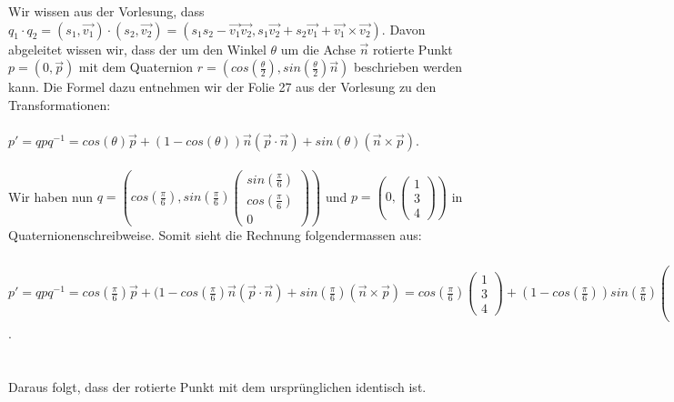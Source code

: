 \documentclass{article} %
\begin{document}
Wir wissen aus der Vorlesung, dass $q_1 \cdot q_2 = (s_1, \vec{v_1}) \cdot (s_2, \vec{v_2}) = (s_1 s_2 - \vec{v_1} \vec{v_2}, s_1 \vec{v_2} + s_2 \vec{v_1} + \vec{v_1} \times \vec{v_2})$. Davon abgeleitet wissen wir, dass der um den Winkel $\theta$ um die Achse $\vec{n}$ rotierte Punkt $p = (0, \vec{p})$ mit dem Quaternion $r = (cos(\frac{\theta}{2}), sin(\frac{\theta}{2})\vec{n})$ beschrieben werden kann. Die Formel dazu entnehmen wir der Folie 27 aus der Vorlesung zu den Transformationen: \\\\$p' = qpq^{-1} = cos(\theta)\vec{p} + (1 - cos(\theta))\vec{n}(\vec{p} \cdot \vec{n}) + sin(\theta) (\vec{n} \times \vec{p})$. \\\\
Wir haben nun $q = (cos(\frac{\pi}{6}), sin(\frac{\pi}{6})\begin{pmatrix}
sin(\frac{\pi}{6})\\
cos(\frac{\pi}{6})\\
0
\end{pmatrix})$ und $p = (0, \begin{pmatrix}
1\\
3\\
4
\end{pmatrix})$ in Quaternionenschreibweise. Somit sieht die Rechnung folgendermassen aus: \\\\
$p' = qpq^{-1} = cos(\frac{\pi}{6})\vec{p} + (1 - cos(\frac{\pi}{6})\vec{n}(\vec{p} \cdot \vec{n}) + sin(\frac{\pi}{6}) (\vec{n} \times \vec{p}) = cos(\frac{\pi}{6}) \begin{pmatrix}
1\\
3\\
4
\end{pmatrix} + (1 - cos(\frac{\pi}{6})) sin(\frac{\pi}{6}) \begin{pmatrix}
sin(\frac{\pi}{6})\\
cos(\frac{\pi}{6})\\
0
\end{pmatrix} \cdot \begin{pmatrix}
sin^2(\frac{\pi}{6})\\
3sin(\frac{\pi}{6})cos(\frac{\pi}{6})\\
0
\end{pmatrix} + sin(\frac{\pi}{6}) \begin{pmatrix}
4sin(\frac{\pi}{6})cos(\frac{\pi}{6})\\
-4sin^2(\frac{\pi}{6})\\
3 sin(\frac{\pi}{6}) - cos(\frac{\pi}{6})
\end{pmatrix} = \dotso = \begin{pmatrix}
1\\
3\\
4
\end{pmatrix}$. \\\\\\
Daraus folgt, dass der rotierte Punkt mit dem ursprünglichen identisch ist.
\end{document}
